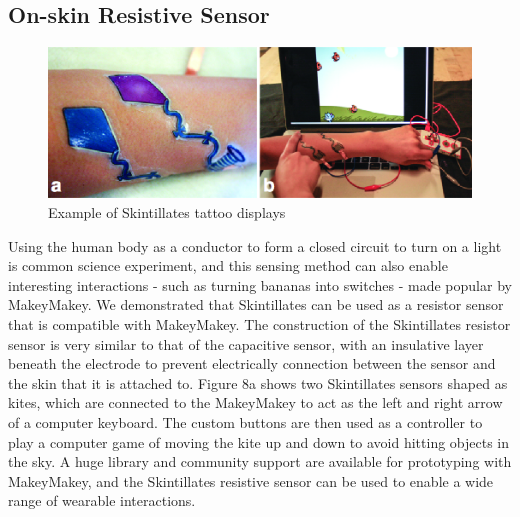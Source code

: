 \documentclass{sigchi}
\begin{document}
\subsection {On-skin Resistive Sensor}
\begin{figure}
\centering
\includegraphics[width=1\columnwidth]{figures/Figure8}
\caption{Example of Skintillates tattoo displays}
\vspace{-8pt}
\label{fig:figure8}
\end{figure}
Using the human body as a conductor to form a closed circuit to turn on a light is common science experiment, and this sensing method can also enable interesting interactions - such as turning bananas into switches - made popular by MakeyMakey. We demonstrated that Skintillates can be used as a resistor sensor that is compatible with MakeyMakey. The construction of the Skintillates resistor sensor is very similar to that of the capacitive sensor, with an insulative layer beneath the electrode to prevent electrically connection between the sensor and the skin that it is attached to. Figure 8a shows two Skintillates sensors shaped as kites, which are connected to the MakeyMakey to act as the left and right arrow of a computer keyboard. The custom buttons are then used as a controller to play a computer game of moving the kite up and down to avoid hitting objects in the sky. A huge library and community support are available for prototyping with MakeyMakey, and the Skintillates resistive sensor can be used to enable a wide range of wearable interactions. 
\end{document}
